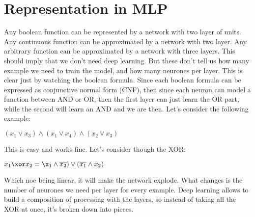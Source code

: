 \section{Representation in MLP}
Any boolean function can be represented by a network with two layer of units.\newline
Any continuous function can be approximated by a network with two layer.\newline
Any arbitrary function can be approximated by a network with three layers.\newline
This should imply that we don't need deep learning. But these don't tell us how many example we need to train the model, and how many neurones per layer. This is clear just by watching the boolean formula. Since each boolean formula can be expressed as conjunctive normal form (CNF), then since each neuron can model a function between AND or OR, then the first layer can just learn the OR part, while the second will learn an AND and we are then.\newline
Let's consider the following example:
\begin{center}
	$\displaystyle (x_1\vee x_3)\wedge(x_1\vee x_4)\wedge(x_2\vee x_3)$
\end{center}
This is easy and works fine. Let's consider though the XOR:
\begin{center}
	$\displaystyle x_1\xor x_2=\x_1\wedge \overline{x_2})\vee(\overline{x_1}\wedge x_2)$
\end{center}
Which noe being linear, it will make the network explode.\newline
What changes is the number of neurones we need per layer for every example. \newline
Deep learning allows to build a composition of processing with the layers, so instead of taking all the XOR at once, it's broken down into pieces.
